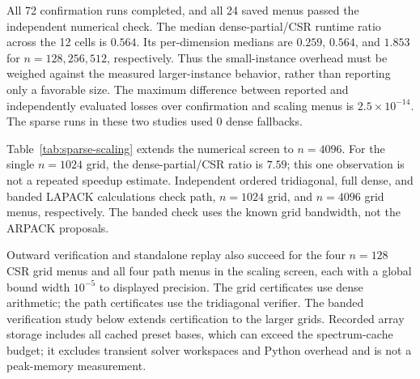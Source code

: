 All 72 confirmation runs completed, and all 24 saved menus passed the
independent numerical check. The median dense-partial/CSR runtime ratio
across the 12 cells is $0.564$. Its per-dimension medians
are $0.259$, $0.564$, and
$1.853$ for $n=128,256,512$, respectively.
Thus the small-instance overhead must be weighed against the measured
larger-instance behavior, rather than reporting only a favorable size.
The maximum difference between reported and independently evaluated losses
over confirmation and scaling menus is $2.5\times10^{-14}$.
The sparse runs in these two studies used 0 dense fallbacks.

Table~\ref{tab:sparse-scaling} extends the numerical screen to $n=4096$.
For the single $n=1024$ grid, the dense-partial/CSR ratio is $7.59$;
this one observation is not a repeated speedup estimate. Independent
ordered tridiagonal, full dense, and banded LAPACK calculations check path,
$n=1024$ grid, and $n=4096$ grid menus, respectively. The banded check uses
the known grid bandwidth, not the ARPACK proposals.

Outward verification and standalone replay also succeed for the four
$n=128$ CSR grid menus and all four path menus in the scaling screen,
each with a global bound width $10^{-5}$ to displayed precision. The grid certificates
use dense arithmetic; the path certificates use the tridiagonal verifier.
The banded verification study below extends certification to the larger grids.
Recorded array storage includes all cached preset bases, which can exceed
the spectrum-cache budget; it excludes transient solver workspaces and
Python overhead and is not a peak-memory measurement.
